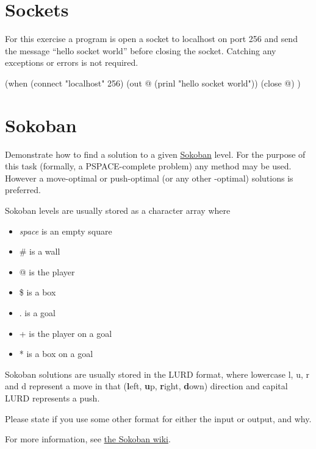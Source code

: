 \pagebreak{}
\section*{Sockets}

For this exercise a program is open a socket to localhost on port 256
and send the message ``hello socket world'' before closing the socket.
Catching any exceptions or errors is not required.

\begin{wideverbatim}

(when (connect "localhost" 256)
   (out @ (prinl "hello socket world"))
   (close @) )

\end{wideverbatim}

\pagebreak{}
\section*{Sokoban}

Demonstrate how to find a solution to a given
\href{http://en.wikipedia.org/wiki/Sokoban}{Sokoban} level. For the
purpose of this task (formally, a PSPACE-complete problem) any method
may be used. However a move-optimal or push-optimal (or any other
-optimal) solutions is preferred.

Sokoban levels are usually stored as a character array where

\begin{itemize}
\item
  \emph{space} is an empty square
\item
  \# is a wall
\item
  @ is the player
\item
  \$ is a box
\item
  . is a goal
\item
  + is the player on a goal
\item
  * is a box on a goal
\end{itemize}

Sokoban solutions are usually stored in the LURD format, where lowercase
l, u, r and d represent a move in that (\textbf{l}eft, \textbf{u}p,
\textbf{r}ight, \textbf{d}own) direction and capital LURD represents a
push.

Please state if you use some other format for either the input or
output, and why.

For more information, see
\href{http://www.sokobano.de/wiki/index.php?title=Main\_Page}{the
Sokoban wiki}.

